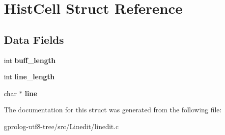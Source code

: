 \hypertarget{structHistCell}{}\section{Hist\+Cell Struct Reference}
\label{structHistCell}
\subsection*{Data Fields}
\begin{DoxyCompactItemize}
\item 
int {\bfseries buff\+\_\+length}\hypertarget{structHistCell_a969bc82748a2a5ec09f62d138f62d206}{}\label{structHistCell_a969bc82748a2a5ec09f62d138f62d206}

\item 
int {\bfseries line\+\_\+length}\hypertarget{structHistCell_aab32370dee81b023aa2d04e3c6a148e4}{}\label{structHistCell_aab32370dee81b023aa2d04e3c6a148e4}

\item 
char $\ast$ {\bfseries line}\hypertarget{structHistCell_a7c9560a76c886d7c26f118668303945a}{}\label{structHistCell_a7c9560a76c886d7c26f118668303945a}

\end{DoxyCompactItemize}


The documentation for this struct was generated from the following file\+:\begin{DoxyCompactItemize}
\item 
gprolog-\/utf8-\/tree/src/\+Linedit/linedit.\+c\end{DoxyCompactItemize}
